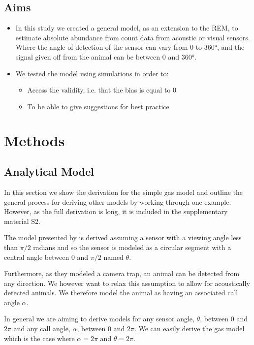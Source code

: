 \documentclass[a4paper,10pt,reqno,oneside]{amsart}
\begin{document}
\subsection{Aims}

\begin{itemize}
\item  In this study we created a general model, as an extension to the REM, to estimate absolute abundance from count data from acoustic or visual sensors. Where the angle of detection of the sensor can vary from 0 to 360°, and the signal given off from the animal can be between 0 and 360°.
\item  We tested the model using simulations in order to:
\begin{itemize}
\item Access the validity, i.e. that the bias is equal to 0
\item  To be able to give suggestions for best practice
\end{itemize}
\end{itemize}


\section{Methods}

\subsection{Analytical Model}

In this section we show the derivation for the simple gas model and outline the general process for deriving other models by working through one example. However, as the full derivation is long, it is included in the supplementary material S2.

The model presented by \citep{rowcliffe2008estimating} is derived assuming a sensor with a viewing angle less than $\pi/2$ radians and so the sensor is modeled as a circular segment with a central angle between 0 and  $\pi/2$ named  $\theta$.

Furthermore, as they modeled a camera trap, an animal can be detected from any direction. We however want to relax this assumption to allow for acoustically detected animals. We therefore model the animal as having an associated call angle $\alpha$.

In general we are aiming to derive models for any sensor angle, $ \theta$, between 0 and $2\pi$ and any call angle, $ \alpha$, between 0 and $2\pi$. We can easily derive the gas model which is the case where $ \alpha =  2\pi$ and $ \theta =  2\pi$.
\end{document}
